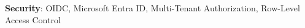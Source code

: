 \item{\textbf{Security}{: OIDC, Microsoft Entra ID, Multi-Tenant Authorization, Row-Level Access Control}}
